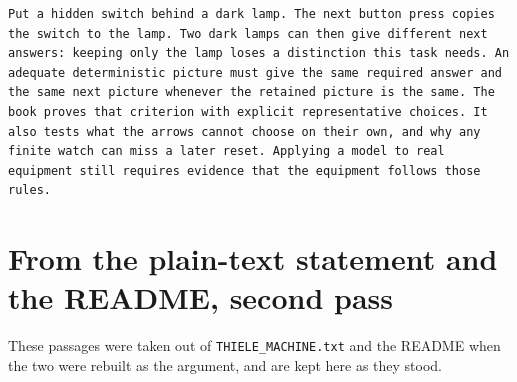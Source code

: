 \documentclass[11pt,twoside]{article}
\theoremstyle{thielethm}
\theoremstyle{thieledef}
\theoremstyle{thieledef}
\theoremstyle{thieledef}
\theoremstyle{thielethm}
\theoremstyle{thieleobs}
\theoremstyle{thielethm}
\begin{document}
\begin{small}
\begin{verbatim}
Put a hidden switch behind a dark lamp. The next button press copies the switch to the lamp. Two dark lamps can then give different next answers: keeping only the lamp loses a distinction this task needs. An adequate deterministic picture must give the same required answer and the same next picture whenever the retained picture is the same. The book proves that criterion with explicit representative choices. It also tests what the arrows cannot choose on their own, and why any finite watch can miss a later reset. Applying a model to real equipment still requires evidence that the equipment follows those rules.

\end{verbatim}\end{small}

\section{From the plain-text statement and the README, second pass}

These passages were taken out of \texttt{THIELE\_MACHINE.txt} and the README when the two were rebuilt as the argument, and are kept here as they stood.
\end{document}
